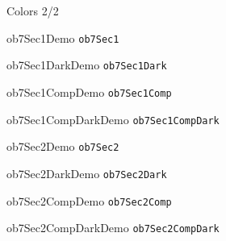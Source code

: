 \documentclass[compress,aspectratio=169]{beamer}
\begin{document}
\begin{frame}{Colors 2/2}
    \begin{multicols}{2}

        \begin{beamercolorbox}[wd=\linewidth,ht=2ex,dp=0.7ex]{ob7Sec1Demo}
            \texttt{ob7Sec1}
        \end{beamercolorbox}
        \begin{beamercolorbox}[wd=\linewidth,ht=2ex,dp=0.7ex]{ob7Sec1DarkDemo}
            \texttt{ob7Sec1Dark}
        \end{beamercolorbox}
        \begin{beamercolorbox}[wd=\linewidth,ht=2ex,dp=0.7ex]{ob7Sec1CompDemo}
            \texttt{ob7Sec1Comp}
        \end{beamercolorbox}
        \begin{beamercolorbox}[wd=\linewidth,ht=2ex,dp=0.7ex]{ob7Sec1CompDarkDemo}
            \texttt{ob7Sec1CompDark}
        \end{beamercolorbox}

        \begin{beamercolorbox}[wd=\linewidth,ht=2ex,dp=0.7ex]{ob7Sec2Demo}
            \texttt{ob7Sec2}
        \end{beamercolorbox}
        \begin{beamercolorbox}[wd=\linewidth,ht=2ex,dp=0.7ex]{ob7Sec2DarkDemo}
            \texttt{ob7Sec2Dark}
        \end{beamercolorbox}
        \begin{beamercolorbox}[wd=\linewidth,ht=2ex,dp=0.7ex]{ob7Sec2CompDemo}
            \texttt{ob7Sec2Comp}
        \end{beamercolorbox}
        \begin{beamercolorbox}[wd=\linewidth,ht=2ex,dp=0.7ex]{ob7Sec2CompDarkDemo}
            \texttt{ob7Sec2CompDark}
        \end{beamercolorbox}


\end{multicols}
\end{frame}
\end{document}
